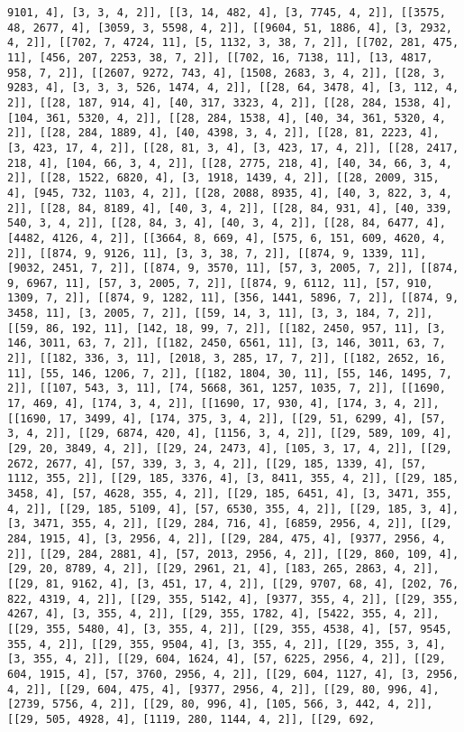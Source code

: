 \documentclass[12pt,fleqn]{article}\usepackage{../../common}
\begin{document}
\begin{verbatim}
9101, 4], [3, 3, 4, 2]], [[3, 14, 482, 4], [3, 7745, 4, 2]], [[3575, 48, 2677, 4], [3059, 3, 5598, 4, 2]], [[9604, 51, 1886, 4], [3, 2932, 4, 2]], [[702, 7, 4724, 11], [5, 1132, 3, 38, 7, 2]], [[702, 281, 475, 11], [456, 207, 2253, 38, 7, 2]], [[702, 16, 7138, 11], [13, 4817, 958, 7, 2]], [[2607, 9272, 743, 4], [1508, 2683, 3, 4, 2]], [[28, 3, 9283, 4], [3, 3, 3, 526, 1474, 4, 2]], [[28, 64, 3478, 4], [3, 112, 4, 2]], [[28, 187, 914, 4], [40, 317, 3323, 4, 2]], [[28, 284, 1538, 4], [104, 361, 5320, 4, 2]], [[28, 284, 1538, 4], [40, 34, 361, 5320, 4, 2]], [[28, 284, 1889, 4], [40, 4398, 3, 4, 2]], [[28, 81, 2223, 4], [3, 423, 17, 4, 2]], [[28, 81, 3, 4], [3, 423, 17, 4, 2]], [[28, 2417, 218, 4], [104, 66, 3, 4, 2]], [[28, 2775, 218, 4], [40, 34, 66, 3, 4, 2]], [[28, 1522, 6820, 4], [3, 1918, 1439, 4, 2]], [[28, 2009, 315, 4], [945, 732, 1103, 4, 2]], [[28, 2088, 8935, 4], [40, 3, 822, 3, 4, 2]], [[28, 84, 8189, 4], [40, 3, 4, 2]], [[28, 84, 931, 4], [40, 339, 540, 3, 4, 2]], [[28, 84, 3, 4], [40, 3, 4, 2]], [[28, 84, 6477, 4], [4482, 4126, 4, 2]], [[3664, 8, 669, 4], [575, 6, 151, 609, 4620, 4, 2]], [[874, 9, 9126, 11], [3, 3, 38, 7, 2]], [[874, 9, 1339, 11], [9032, 2451, 7, 2]], [[874, 9, 3570, 11], [57, 3, 2005, 7, 2]], [[874, 9, 6967, 11], [57, 3, 2005, 7, 2]], [[874, 9, 6112, 11], [57, 910, 1309, 7, 2]], [[874, 9, 1282, 11], [356, 1441, 5896, 7, 2]], [[874, 9, 3458, 11], [3, 2005, 7, 2]], [[59, 14, 3, 11], [3, 3, 184, 7, 2]], [[59, 86, 192, 11], [142, 18, 99, 7, 2]], [[182, 2450, 957, 11], [3, 146, 3011, 63, 7, 2]], [[182, 2450, 6561, 11], [3, 146, 3011, 63, 7, 2]], [[182, 336, 3, 11], [2018, 3, 285, 17, 7, 2]], [[182, 2652, 16, 11], [55, 146, 1206, 7, 2]], [[182, 1804, 30, 11], [55, 146, 1495, 7, 2]], [[107, 543, 3, 11], [74, 5668, 361, 1257, 1035, 7, 2]], [[1690, 17, 469, 4], [174, 3, 4, 2]], [[1690, 17, 930, 4], [174, 3, 4, 2]], [[1690, 17, 3499, 4], [174, 375, 3, 4, 2]], [[29, 51, 6299, 4], [57, 3, 4, 2]], [[29, 6874, 420, 4], [1156, 3, 4, 2]], [[29, 589, 109, 4], [29, 20, 3849, 4, 2]], [[29, 24, 2473, 4], [105, 3, 17, 4, 2]], [[29, 2672, 2677, 4], [57, 339, 3, 3, 4, 2]], [[29, 185, 1339, 4], [57, 1112, 355, 2]], [[29, 185, 3376, 4], [3, 8411, 355, 4, 2]], [[29, 185, 3458, 4], [57, 4628, 355, 4, 2]], [[29, 185, 6451, 4], [3, 3471, 355, 4, 2]], [[29, 185, 5109, 4], [57, 6530, 355, 4, 2]], [[29, 185, 3, 4], [3, 3471, 355, 4, 2]], [[29, 284, 716, 4], [6859, 2956, 4, 2]], [[29, 284, 1915, 4], [3, 2956, 4, 2]], [[29, 284, 475, 4], [9377, 2956, 4, 2]], [[29, 284, 2881, 4], [57, 2013, 2956, 4, 2]], [[29, 860, 109, 4], [29, 20, 8789, 4, 2]], [[29, 2961, 21, 4], [183, 265, 2863, 4, 2]], [[29, 81, 9162, 4], [3, 451, 17, 4, 2]], [[29, 9707, 68, 4], [202, 76, 822, 4319, 4, 2]], [[29, 355, 5142, 4], [9377, 355, 4, 2]], [[29, 355, 4267, 4], [3, 355, 4, 2]], [[29, 355, 1782, 4], [5422, 355, 4, 2]], [[29, 355, 5480, 4], [3, 355, 4, 2]], [[29, 355, 4538, 4], [57, 9545, 355, 4, 2]], [[29, 355, 9504, 4], [3, 355, 4, 2]], [[29, 355, 3, 4], [3, 355, 4, 2]], [[29, 604, 1624, 4], [57, 6225, 2956, 4, 2]], [[29, 604, 1915, 4], [57, 3760, 2956, 4, 2]], [[29, 604, 1127, 4], [3, 2956, 4, 2]], [[29, 604, 475, 4], [9377, 2956, 4, 2]], [[29, 80, 996, 4], [2739, 5756, 4, 2]], [[29, 80, 996, 4], [105, 566, 3, 442, 4, 2]], [[29, 505, 4928, 4], [1119, 280, 1144, 4, 2]], [[29, 692, 
\end{verbatim}
\end{document}
